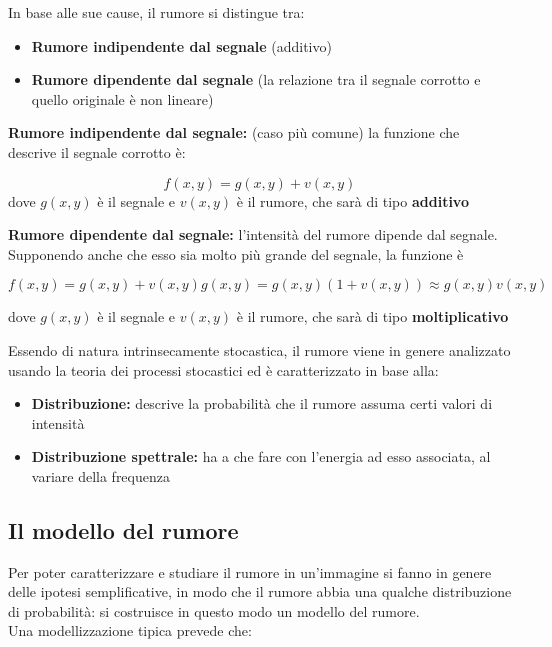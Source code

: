 In base alle sue cause, il rumore si distingue tra:
\begin{itemize}
    \item \textbf{Rumore indipendente dal segnale} (additivo)
    \item \textbf{Rumore dipendente dal segnale} (la relazione tra il segnale
          corrotto e quello originale è non lineare)
\end{itemize}

\begin{trivlist}
    \item \textbf{Rumore indipendente dal segnale:} (caso più comune) la funzione
    che descrive il segnale corrotto è:

    $$
        f(x,y) = g(x,y)+v(x,y)
    $$
    dove $g(x,y)$ è il segnale e $v(x,y)$ è il rumore, che sarà di tipo
    \textbf{additivo}

    \item \textbf{Rumore dipendente dal segnale:} l'intensità del rumore dipende
    dal segnale. Supponendo anche che esso sia molto più grande del segnale, la
    funzione è

    $$
        f(x,y)=g(x,y)+v(x,y)g(x,y)=g(x,y)(1+v(x,y)) \approx g(x,y)v(x,y)
    $$

    dove $g(x,y)$ è il segnale e $v(x,y)$ è il rumore, che sarà di tipo
    \textbf{moltiplicativo}
\end{trivlist}

Essendo di natura intrinsecamente stocastica, il rumore viene in genere analizzato usando la teoria dei processi stocastici ed è
caratterizzato in base alla:

\begin{itemize}
    \item \textbf{Distribuzione:} descrive la probabilità che il rumore assuma
          certi valori di intensità
    \item \textbf{Distribuzione spettrale:} ha a che fare con l'energia ad esso
          associata, al variare della frequenza
\end{itemize}

\subsection{Il modello del rumore}

Per poter caratterizzare e studiare il rumore in un'immagine si fanno in genere delle ipotesi semplificative, in modo che il rumore abbia una qualche distribuzione di probabilità: si costruisce in
questo modo un modello del rumore.
\\Una modellizzazione tipica prevede che:

